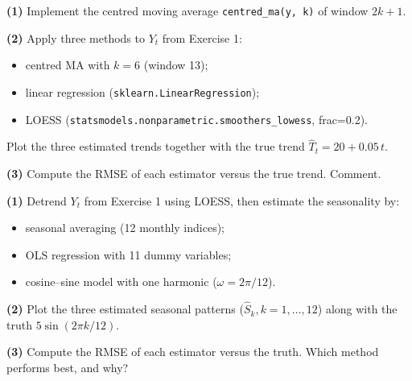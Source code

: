 \documentclass[a4paper,11pt]{article}
\begin{document}
\begin{exercise}
\textbf{(1)} Implement the centred moving average
\texttt{centred\_ma(y, k)} of window $2k + 1$.

\textbf{(2)} Apply three methods to $Y_t$ from Exercise 1:
\begin{itemize}
  \item centred MA with $k = 6$ (window 13);
  \item linear regression (\texttt{sklearn.LinearRegression});
  \item LOESS (\texttt{statsmodels.nonparametric.smoothers\_lowess}, frac=0.2).
\end{itemize}
Plot the three estimated trends together with the true trend
$\widehat T_t = 20 + 0.05\,t$.

\textbf{(3)} Compute the RMSE of each estimator versus the true trend.
Comment.
\end{exercise}

\begin{exercise}
\textbf{(1)} Detrend $Y_t$ from Exercise 1 using LOESS, then estimate
the seasonality by:
\begin{itemize}
  \item seasonal averaging (12 monthly indices);
  \item OLS regression with 11 dummy variables;
  \item cosine--sine model with one harmonic ($\omega = 2\pi / 12$).
\end{itemize}

\textbf{(2)} Plot the three estimated seasonal patterns
($\widehat S_k, k = 1, \dots, 12$) along with the truth
$5 \sin(2\pi k / 12)$.

\textbf{(3)} Compute the RMSE of each estimator versus the truth.
Which method performs best, and why?
\end{exercise}
\end{document}
